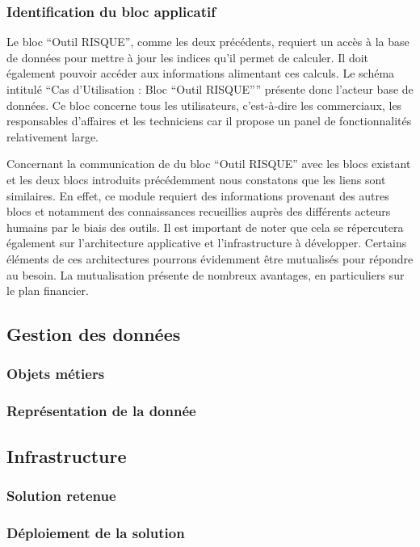 \subsubsection{Identification du bloc applicatif}

Le bloc “Outil RISQUE”, comme les deux précédents, requiert un accès à la base de données pour mettre à jour les indices qu’il permet de calculer. Il doit également pouvoir accéder aux informations alimentant ces calculs. Le schéma intitulé “Cas d’Utilisation : Bloc “Outil RISQUE”” présente donc l’acteur base de données. Ce bloc concerne tous les utilisateurs, c’est-à-dire les commerciaux, les responsables d’affaires et les techniciens car il propose un panel de fonctionnalités relativement large.


Concernant la communication de du bloc “Outil RISQUE” avec les blocs existant et les deux blocs introduits précédemment nous constatons que les liens sont similaires. En effet, ce module requiert des informations provenant des autres blocs et notamment des connaissances recueillies auprès des différents acteurs humains par le biais des outils. Il est important de noter que cela se répercutera également sur l’architecture applicative et l’infrastructure à développer. Certains éléments de ces architectures pourrons évidemment être mutualisés pour répondre au besoin. La mutualisation présente de nombreux avantages, en particuliers sur le plan financier.


\subsection{Gestion des données}

\subsubsection{Objets métiers}


\subsubsection{Représentation de la donnée}


\subsection{Infrastructure}

\subsubsection{Solution retenue}


\subsubsection{Déploiement de la solution}

